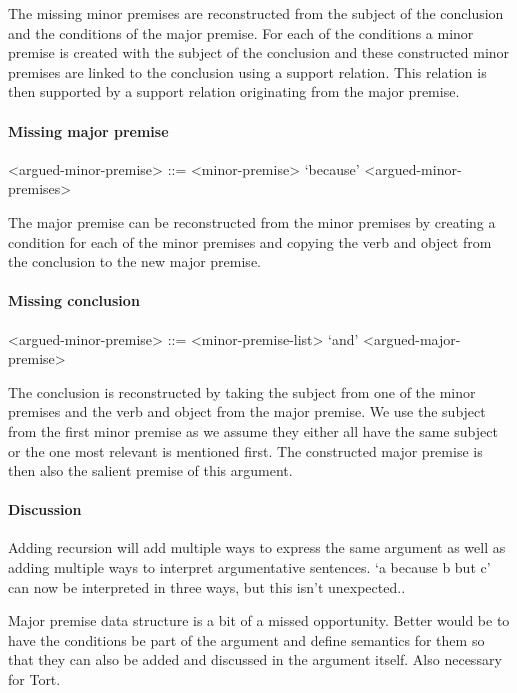 \noindent The missing minor premises are reconstructed from the subject of the conclusion and the conditions of the major premise. For each of the conditions a minor premise is created with the subject of the conclusion and these constructed minor premises are linked to the conclusion using a support relation. This relation is then supported by a support relation originating from the major premise.

\paragraph{Missing major premise}
\begin{grammar}
<argued-minor-premise> ::= <minor-premise> `because' <argued-minor-premises> %
\end{grammar}

\noindent The major premise can be reconstructed from the minor premises by creating a condition for each of the minor premises and copying the verb and object from the conclusion to the new major premise.

\paragraph{Missing conclusion}
\begin{grammar}
<argued-minor-premise> ::= <minor-premise-list> `and' <argued-major-premise> %
\end{grammar}

\noindent The conclusion is reconstructed by taking the subject from one of the minor premises and the verb and object from the major premise. We use the subject from the first minor premise as we assume they either all have the same subject or the one most relevant is mentioned first. The constructed major premise is then also the salient premise of this argument.

\paragraph{Discussion}
Adding recursion will add multiple ways to express the same argument as well as adding multiple ways to interpret argumentative sentences. `a because b but c' can now be interpreted in three ways, but this isn't unexpected..

Major premise data structure is a bit of a missed opportunity. Better would be to have the conditions be part of the argument and define semantics for them so that they can also be added and discussed in the argument itself. Also necessary for Tort.